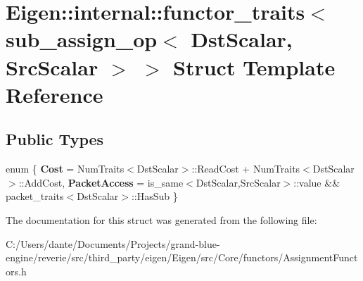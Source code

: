 \hypertarget{struct_eigen_1_1internal_1_1functor__traits_3_01sub__assign__op_3_01_dst_scalar_00_01_src_scalar_01_4_01_4}{}\section{Eigen\+::internal\+::functor\+\_\+traits$<$ sub\+\_\+assign\+\_\+op$<$ Dst\+Scalar, Src\+Scalar $>$ $>$ Struct Template Reference}
\label{struct_eigen_1_1internal_1_1functor__traits_3_01sub__assign__op_3_01_dst_scalar_00_01_src_scalar_01_4_01_4}
\subsection*{Public Types}
\begin{DoxyCompactItemize}
\item 
\mbox{\label{struct_eigen_1_1internal_1_1functor__traits_3_01sub__assign__op_3_01_dst_scalar_00_01_src_scalar_01_4_01_4_acbbd35d3c0a701f3e9bc5d5876cc6ed0}} 
enum \{ {\bfseries Cost} = Num\+Traits$<$Dst\+Scalar$>$\+::Read\+Cost + Num\+Traits$<$Dst\+Scalar$>$\+::Add\+Cost, 
{\bfseries Packet\+Access} = is\+\_\+same$<$Dst\+Scalar,Src\+Scalar$>$\+::value \&\& packet\+\_\+traits$<$Dst\+Scalar$>$\+::Has\+Sub
 \}
\end{DoxyCompactItemize}


The documentation for this struct was generated from the following file\+:\begin{DoxyCompactItemize}
\item 
C\+:/\+Users/dante/\+Documents/\+Projects/grand-\/blue-\/engine/reverie/src/third\+\_\+party/eigen/\+Eigen/src/\+Core/functors/Assignment\+Functors.\+h\end{DoxyCompactItemize}
